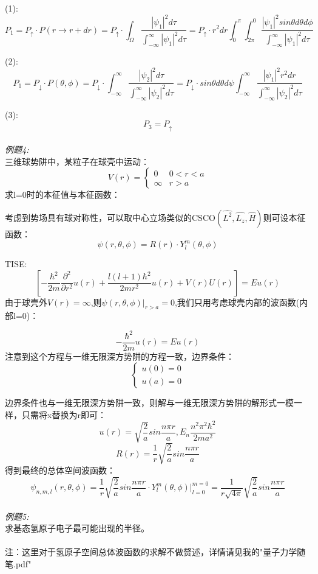 \documentclass[UTF8]{ctexart}
\begin{document}
(1):
\[
    P_1 = P_{\uparrow} \cdot P(r \to r+dr)
    =P_{\uparrow} \cdot \int_{\Omega} \frac{|\psi_1|^2 d\tau}{  \int_{-\infty}^{\infty}|\psi_1|^2 d\tau }
    =P_{\uparrow} \cdot r^2dr \int_{0}^{\pi}\int_{2\pi}^{0}\frac{|\psi_1|^2 sin\theta d\theta d\phi}{\int_{-\infty}^{\infty}|\psi_1|^2 d\tau}
\]

(2):
\[
    P_1 = P_{\downarrow} \cdot P(\theta,\phi)
    =P_{\downarrow} \cdot \int_{-\infty}^{\infty} \frac{|\psi_2|^2 d\tau}{  \int_{-\infty}^{\infty}|\psi_2|^2 d\tau }
    =P_{\downarrow} \cdot sin\theta d\theta d\psi \int_{-\infty}^{\infty}\frac{|\psi_1|^2 r^2dr}{\int_{-\infty}^{\infty}|\psi_2|^2 d\tau}
\]

(3):
\[
    P_3=P_{\uparrow}
\]
\\

\emph{例题4:}
\\
三维球势阱中，某粒子在球壳中运动：
\[
    V(r) = 
    \begin{cases}
        0 & 0<r<a\\
        \infty & r>a
    \end{cases}
\]
求l=0时的本征值与本征函数：

考虑到势场具有球对称性，可以取中心立场类似的CSCO$(\hat{L^2},\hat{L_z},\hat{H})$则可设本征函数：
\[
    \psi(r,\theta,\phi) = R(r)\cdot Y_l^m(\theta,\phi)
\]

TISE:
\[
    [-\frac{\hbar^2}{2m}\frac{\partial^2}{\partial r^2}u(r) + \frac{l(l+1)\hbar^2}{2mr^2}u(r)+V(r)U(r)] = E u(r)
\]
由于球壳外$V(r)=\infty$,则$\psi(r,\theta,\phi)|_{r>a}=0$,我们只用考虑球壳内部的波函数(内部l=0)：

\[
    -\frac{\hbar^2}{2m} u(r) = E u(r)
\]
注意到这个方程与一维无限深方势阱的方程一致，边界条件：
\[
    \begin{cases}
    u(0)=0\\
    u(a)=0
    \end{cases}
\]

边界条件也与一维无限深方势阱一致，则解与一维无限深方势阱的解形式一模一样，只需将x替换为r即可：
\[
    u(r) = \sqrt{\frac{2}{a}} sin\frac{n \pi r}{a} , E_n\frac{n^2 \pi^2 \hbar^2}{2ma^2}
\]
\[
    R(r) = \frac{1}{r} \sqrt{\frac{2}{a}} sin\frac{n \pi r}{a}
\]
得到最终的总体空间波函数：
\[
    \psi_{n,m,l}(r,\theta ,\phi) = \frac{1}{r} \sqrt{\frac{2}{a}} sin\frac{n \pi r}{a} \cdot Y_l^m(\theta,\phi)|^{m=0}_{l=0}= \frac{1}{r \sqrt{4\pi}} \sqrt{\frac{2}{a}} sin\frac{n \pi r}{a} 
\]\\

\emph{例题5:}\\
求基态氢原子电子最可能出现的半径。\\ \\
注：这里对于氢原子空间总体波函数的求解不做赘述，详情请见我的"量子力学随笔.pdf"\\
\end{document}
